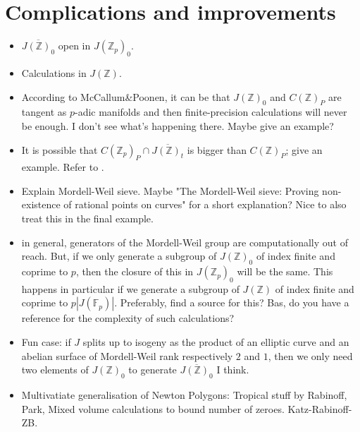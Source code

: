 \documentclass[12pt]{article}
\newcommand{\Z}{\mathbb{Z}}
\newcommand{\F}{\mathbb{F}}
\theoremstyle{plain}
\theoremstyle{definition}
\theoremstyle{remark}
\begin{document}
\section{Complications and improvements}
\label{section:remarks} 
\begin{itemize} 
\item $\overline{J(\Z)_0}$ open in $J(\Z_p)_0$.
\item Calculations in $J(\Z)$.
\item According to McCallum\&Poonen, it can be that $J(\Z)_0$ and $C(\Z)_P$ are tangent as $p$-adic manifolds and then finite-precision calculations will never be enough. I don't see what's happening there. Maybe give an example? 
\item It is possible that $C(\Z_p)_P \cap \overline{J(\Z)_t}$ is bigger than $C(\Z)_P$; give an example. Refer to \citep{Balakrishnan19}.
\item Explain Mordell-Weil sieve. Maybe "The Mordell-Weil sieve: Proving non-existence of rational points on curves" for a short explanation? Nice to also treat this in the final example.
\item in general, generators of the Mordell-Weil group are computationally out of reach. But, if we only generate a subgroup of $J(\Z)_0$ of index finite and coprime to $p$, then the closure of this in $J(\Z_p)_0$ will be the same. This happens in particular if we generate a subgroup of $J(\Z)$ of index finite and coprime to $p|J(\F_p)|$. Preferably, find a source for this? Bas, do you have a reference for the complexity of such calculations?
\item Fun case: if $J$ splits up to isogeny as the product of an elliptic curve and an abelian surface of Mordell-Weil rank respectively $2$ and $1$, then we only need two elements of $J(\Z)_0$ to generate $\overline{J(\Z)_0}$ I think.
\item Multivatiate generalisation of Newton Polygons: Tropical stuff by Rabinoff, Park, Mixed volume calculations to bound number of zeroes. Katz-Rabinoff-ZB.
\end{itemize}
\end{document}
